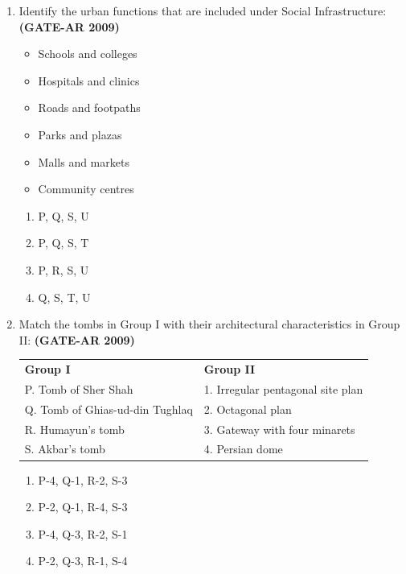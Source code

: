 \documentclass[a4paper,10pt]{article}
\begin{document}
\begin{enumerate}
    \item Identify the urban functions that are included under Social Infrastructure: \hfill \textbf{(GATE-AR 2009)}
    \begin{itemize}
        \item Schools and colleges
        \item Hospitals and clinics
        \item Roads and footpaths
        \item Parks and plazas
        \item Malls and markets
        \item Community centres
    \end{itemize}
    \begin{multicols}{4}
	\begin{enumerate}
        \item P, Q, S, U
        \item P, Q, S, T
        \item P, R, S, U
        \item Q, S, T, U
    \end{enumerate}
	\end{multicols}

    \item Match the tombs in Group I with their architectural characteristics in Group II: \hfill \textbf{(GATE-AR 2009)} \\
    \begin{tabular}{ l l }
	\textbf{Group I} & \textbf{Group II} \\
	P. Tomb of Sher Shah & 1. Irregular pentagonal site plan \\
	Q. Tomb of Ghias-ud-din Tughlaq & 2. Octagonal plan \\
	R. Humayun’s tomb & 3. Gateway with four minarets \\
	S. Akbar’s tomb & 4. Persian dome \\
	\end{tabular}
	\begin{multicols}{2}
	\begin{enumerate}
        \item P-4, Q-1, R-2, S-3
        \item P-2, Q-1, R-4, S-3
        \item P-4, Q-3, R-2, S-1
        \item P-2, Q-3, R-1, S-4
    \end{enumerate}
	\end{multicols}


\end{enumerate}
\end{document}
